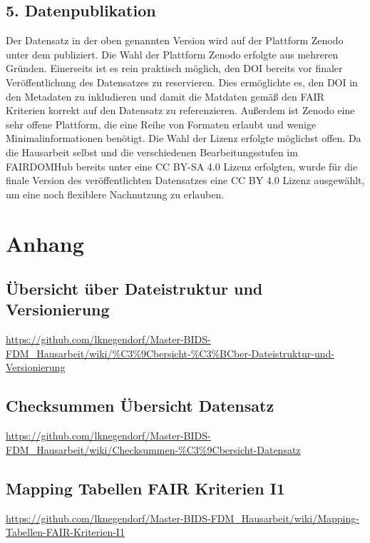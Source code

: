 \documentclass[12pt,a4paper,toc=bibliographynumbered,toc=indenttextentries]{scrreprt}
\begin{document}
		\section*{5. Datenpublikation}
		Der Datensatz in der oben genannten Version wird auf der Plattform Zenodo unter dem  publiziert. Die Wahl der Plattform Zenodo erfolgte aus mehreren Gründen. Einerseits ist es rein praktisch möglich, den DOI bereits vor finaler Veröffentlichung des Datensatzes zu reservieren. Dies ermöglichte es, den DOI in den Metadaten zu inkludieren und damit die Matdaten gemäß den FAIR Kriterien korrekt auf den Datensatz zu referenzieren. Außerdem ist Zenodo eine sehr offene Plattform, die eine Reihe von Formaten erlaubt und wenige Minimalinformationen benötigt.
		Die Wahl der Lizenz erfolgte möglichst offen. Da die Hausarbeit selbst und die verschiedenen Bearbeitungsstufen im FAIRDOMHub bereits unter eine CC BY-SA 4.0 Lizenz erfolgten, wurde für die finale Version des veröffentlichten Datensatzes eine CC BY 4.0 Lizenz ausgewählt, um eine noch flexiblere Nachnutzung zu erlauben.
	
	\clearpage
	\singlespacing
	
	\clearpage
				
	\chapter{Anhang}
		\section{Übersicht über Dateistruktur und Versionierung}
			\url{https://github.com/lknegendorf/Master-BIDS-FDM_Hausarbeit/wiki/%C3%9Cbersicht-%C3%BCber-Dateistruktur-und-Versionierung}
		\section{Checksummen Übersicht Datensatz}
			\url{https://github.com/lknegendorf/Master-BIDS-FDM_Hausarbeit/wiki/Checksummen-%C3%9Cbersicht-Datensatz}
		\section{Mapping Tabellen FAIR Kriterien I1}
			\url{https://github.com/lknegendorf/Master-BIDS-FDM_Hausarbeit/wiki/Mapping-Tabellen-FAIR-Kriterien-I1}
\end{document}
